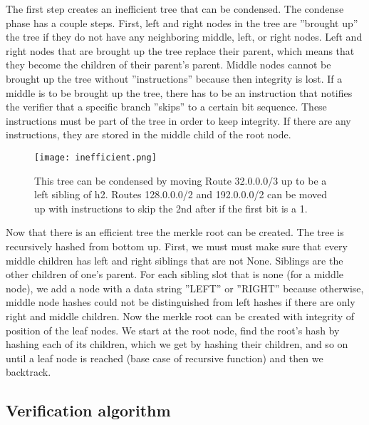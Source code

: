 \documentclass[letterpaper, 10 pt, conference]{ieeeconf}  %
\begin{document}
The first step creates an inefficient tree that can be condensed. The condense phase has a couple steps. First, left and right nodes in the tree are ”brought up” the tree if they do not have any neighboring middle, left, or right nodes. Left and right nodes that are brought up the tree replace their parent, which means that they become the children of their parent’s parent. Middle nodes cannot be brought up the tree without ”instructions” because then integrity is lost. If a middle is to be brought up the tree, there has to be an instruction that notifies the verifier that a specific branch ”skips” to a certain bit sequence. These instructions must be part of the tree in order to keep integrity. If there are any instructions, they are stored in the middle child of the root node. 

\begin{figure}[!ht]
	\centering
	\texttt{[image: inefficient.png]}
    \caption{This tree can be condensed by moving Route 32.0.0.0/3 up to be a left sibling of h2. Routes 128.0.0.0/2 and 192.0.0.0/2 can be moved up with instructions to skip the 2nd after if the first bit is a 1.}
    \end{figure}

Now that there is an efficient tree the merkle root can be created. The tree is recursively hashed from bottom up. First, we must must make sure that every middle children has left and right siblings that are not None. Siblings are the other children of one’s parent. For each sibling slot that is none (for a middle node), we add a node with a data string ”LEFT” or ”RIGHT” because otherwise, middle node hashes could not be distinguished from left hashes if there are only right and middle children. Now the merkle root can be created with integrity of position of the leaf nodes. We start at the root node, find the root’s hash by hashing each of its children, which we get by hashing their children, and so on until a leaf node is reached (base case of recursive function) and then we backtrack. 

\subsection{Verification algorithm}
\end{document}
